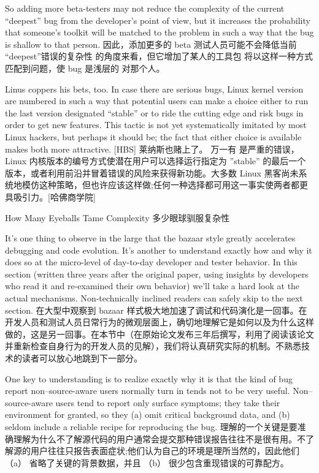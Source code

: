 \documentclass[a4paper,12pt,UTF8,twoside]{ctexbook}
\begin{document}
So adding more beta-testers may not reduce the complexity of the current ``deepest'' bug from the developer's point of view, but it increases the probability that someone's toolkit will be matched to the problem in such a way that the bug is shallow to that person.
因此，添加更多的 beta 测试人员可能不会降低当前 “deepest”错误的复杂性 的角度来看，但它增加了某人的工具包 将以这样一种方式匹配到问题，使 bug 是浅层的 对那个人。

Linus coppers his bets, too. In case there are serious bugs, Linux kernel version are numbered in such a way that potential users can make a choice either to run the last version designated ``stable'' or to ride the cutting edge and risk bugs in order to get new features. This tactic is not yet systematically imitated by most Linux hackers, but perhaps it should be; the fact that either choice is available makes both more attractive. [HBS]
莱纳斯也赌上了。 万一有 是严重的错误，Linux 内核版本的编号方式使潜在用户可以选择运行指定为 ''stable'' 的最后一个版本，或者利用前沿并冒着错误的风险来获得新功能。大多数 Linux 黑客尚未系统地模仿这种策略，但也许应该这样做;任何一种选择都可用这一事实使两者都更具吸引力。[哈佛商学院] 

How Many Eyeballs Tame Complexity
多少眼球驯服复杂性

It's one thing to observe in the large that the bazaar style greatly accelerates debugging and code evolution. It's another to understand exactly how and why it does so at the micro-level of day-to-day developer and tester behavior. In this section (written three years after the original paper, using insights by developers who read it and re-examined their own behavior) we'll take a hard look at the actual mechanisms. Non-technically inclined readers can safely skip to the next section.
在大型中观察到 bazaar 样式极大地加速了调试和代码演化是一回事。在开发人员和测试人员日常行为的微观层面上，确切地理解它是如何以及为什么这样做的，这是另一回事。在本节中（在原始论文发布三年后撰写，利用了阅读该论文并重新检查自身行为的开发人员的见解），我们将认真研究实际的机制。不熟悉技术的读者可以放心地跳到下一部分。

One key to understanding is to realize exactly why it is that the kind of bug report non–source-aware users normally turn in tends not to be very useful. Non–source-aware users tend to report only surface symptoms; they take their environment for granted, so they (a) omit critical background data, and (b) seldom include a reliable recipe for reproducing the bug.
理解的一个关键是要准确理解为什么不了解源代码的用户通常会提交那种错误报告往往不是很有用。不了解源的用户往往只报告表面症状;他们认为自己的环境是理所当然的，因此他们 （a） 省略了关键的背景数据，并且 （b） 很少包含重现错误的可靠配方。
\end{document}
